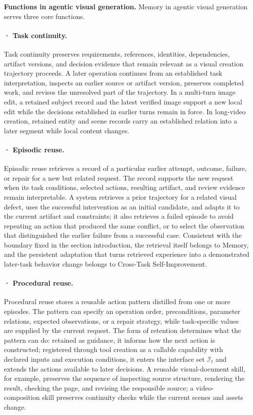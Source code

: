\textbf{Functions in agentic visual generation.} Memory in agentic visual generation serves three core functions.

\paragraph{· Task continuity.} Task continuity preserves requirements, references, identities, dependencies, artifact versions, and decision evidence that remain relevant as a visual creation trajectory proceeds. A later operation continues from an established task interpretation, inspects an earlier source or artifact version, preserves completed work, and revises the unresolved part of the trajectory. In a multi-turn image edit, a retained subject record and the latest verified image support a new local edit while the decisions established in earlier turns remain in force. In long-video creation, retained entity and scene records carry an established relation into a later segment while local content changes.

\paragraph{· Episodic reuse.} Episodic reuse retrieves a record of a particular earlier attempt, outcome, failure, or repair for a new but related request. The record supports the new request when its task conditions, selected actions, resulting artifact, and review evidence remain interpretable. A system retrieves a prior trajectory for a related visual defect, uses the successful intervention as an initial candidate, and adapts it to the current artifact and constraints; it also retrieves a failed episode to avoid repeating an action that produced the same conflict, or to select the observation that distinguished the earlier failure from a successful case. Consistent with the boundary fixed in the section introduction, the retrieval itself belongs to Memory, and the persistent adaptation that turns retrieved experience into a demonstrated later-task behavior change belongs to Cross-Task Self-Improvement.

\paragraph{· Procedural reuse.} Procedural reuse stores a reusable action pattern distilled from one or more episodes. The pattern can specify an operation order, preconditions, parameter relations, expected observations, or a repair strategy, while task-specific values are supplied by the current request. The form of retention determines what the pattern can do: retained as guidance, it informs how the next action is constructed; registered through tool creation as a callable capability with declared inputs and execution conditions, it enters the interface set $\mathcal{I}_t$ and extends the actions available to later decisions. A reusable visual-document skill, for example, preserves the sequence of inspecting source structure, rendering the result, checking the page, and revising the responsible source; a video-composition skill preserves continuity checks while the current scenes and assets change.


